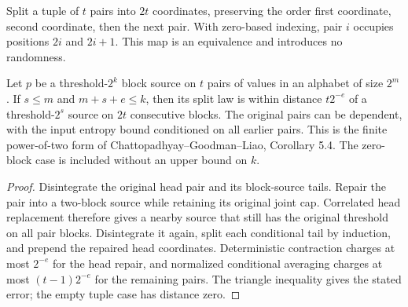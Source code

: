\begin{definition}
  \label{def:lowerbounds-algebraic-block-split}
  \leanok
  Split a tuple of $t$ pairs into $2t$ coordinates, preserving the order
  first coordinate, second coordinate, then the next pair. With zero-based
  indexing, pair $i$ occupies positions $2i$ and $2i+1$. This map is an
  equivalence and introduces no randomness.
\end{definition}

\begin{theorem}
  \label{thm:lowerbounds-algebraic-block-split}
  \leanok
  Let $p$ be a threshold-$2^k$ block source on $t$ pairs of values in an
  alphabet of size $2^m$. If $s\le m$ and $m+s+e\le k$, then its split
  law is within distance $t2^{-e}$ of a threshold-$2^s$ source on $2t$
  consecutive blocks. The original pairs can be dependent, with the input
  entropy bound conditioned on all earlier pairs. This is the finite
  power-of-two form of Chattopadhyay--Goodman--Liao, Corollary 5.4.
  The zero-block case is included without an upper bound on $k$.
\end{theorem}
\begin{proof}
  \leanok
  Disintegrate the original head pair and its block-source tails. Repair
  the pair into a two-block source while retaining its original joint cap.
  Correlated head replacement therefore gives a nearby source that still
  has the original threshold on all pair blocks. Disintegrate it again,
  split each conditional tail by induction, and prepend the repaired head
  coordinates. Deterministic contraction charges at most $2^{-e}$ for the
  head repair, and normalized conditional averaging charges at most
  $(t-1)2^{-e}$ for the remaining pairs. The triangle inequality gives the
  stated error; the empty tuple case has distance zero.
\end{proof}


